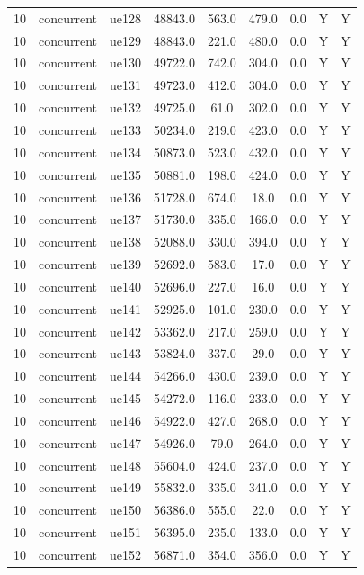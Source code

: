 \begin{table}[ht]
\begin{tabular}{|c|c|c|c|c|c|c|c|c|}
10 & concurrent & ue128 & 48843.0 & 563.0 & 479.0 & 0.0 & Y & Y \\
10 & concurrent & ue129 & 48843.0 & 221.0 & 480.0 & 0.0 & Y & Y \\
10 & concurrent & ue130 & 49722.0 & 742.0 & 304.0 & 0.0 & Y & Y \\
10 & concurrent & ue131 & 49723.0 & 412.0 & 304.0 & 0.0 & Y & Y \\
10 & concurrent & ue132 & 49725.0 & 61.0 & 302.0 & 0.0 & Y & Y \\
10 & concurrent & ue133 & 50234.0 & 219.0 & 423.0 & 0.0 & Y & Y \\
10 & concurrent & ue134 & 50873.0 & 523.0 & 432.0 & 0.0 & Y & Y \\
10 & concurrent & ue135 & 50881.0 & 198.0 & 424.0 & 0.0 & Y & Y \\
10 & concurrent & ue136 & 51728.0 & 674.0 & 18.0 & 0.0 & Y & Y \\
10 & concurrent & ue137 & 51730.0 & 335.0 & 166.0 & 0.0 & Y & Y \\
10 & concurrent & ue138 & 52088.0 & 330.0 & 394.0 & 0.0 & Y & Y \\
10 & concurrent & ue139 & 52692.0 & 583.0 & 17.0 & 0.0 & Y & Y \\
10 & concurrent & ue140 & 52696.0 & 227.0 & 16.0 & 0.0 & Y & Y \\
10 & concurrent & ue141 & 52925.0 & 101.0 & 230.0 & 0.0 & Y & Y \\
10 & concurrent & ue142 & 53362.0 & 217.0 & 259.0 & 0.0 & Y & Y \\
10 & concurrent & ue143 & 53824.0 & 337.0 & 29.0 & 0.0 & Y & Y \\
10 & concurrent & ue144 & 54266.0 & 430.0 & 239.0 & 0.0 & Y & Y \\
10 & concurrent & ue145 & 54272.0 & 116.0 & 233.0 & 0.0 & Y & Y \\
10 & concurrent & ue146 & 54922.0 & 427.0 & 268.0 & 0.0 & Y & Y \\
10 & concurrent & ue147 & 54926.0 & 79.0 & 264.0 & 0.0 & Y & Y \\
10 & concurrent & ue148 & 55604.0 & 424.0 & 237.0 & 0.0 & Y & Y \\
10 & concurrent & ue149 & 55832.0 & 335.0 & 341.0 & 0.0 & Y & Y \\
10 & concurrent & ue150 & 56386.0 & 555.0 & 22.0 & 0.0 & Y & Y \\
10 & concurrent & ue151 & 56395.0 & 235.0 & 133.0 & 0.0 & Y & Y \\
10 & concurrent & ue152 & 56871.0 & 354.0 & 356.0 & 0.0 & Y & Y \\

\end{tabular}
\end{table}

